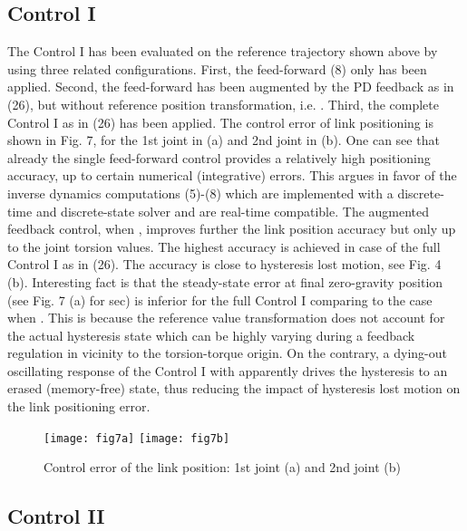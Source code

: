 \documentclass[a4paper, 10pt, conference]{ieeeconf}
\begin{document}
\subsection*{Control I} \label{sec:6:1}


The Control I has been evaluated on the reference trajectory shown
above by using three related configurations. First, the
feed-forward (8) only has been applied. Second, the feed-forward
has been augmented by the PD feedback as in (26), but without
reference position transformation, i.e. .
Third, the complete Control I as in (26) has been applied. The
control error of link positioning is shown in Fig. 7, for the 1st
joint in (a) and 2nd joint in (b). One can see that already the
single feed-forward control provides a relatively high positioning
accuracy, up to certain numerical (integrative) errors. This
argues in favor of the inverse dynamics computations (5)-(8) which
are implemented with a discrete-time and discrete-state solver and
are real-time compatible. The augmented feedback control, when
, improves further the link position accuracy
but only up to the joint torsion values. The highest accuracy is
achieved in case of the full Control I as in (26). The accuracy is
close to hysteresis lost motion, see Fig. 4 (b).
Interesting fact is that the steady-state error at final
zero-gravity position (see Fig. 7 (a) for  sec) is inferior
for the full Control I comparing to the case when . This is because the reference value transformation does
not account for the actual hysteresis state which can be highly
varying during a feedback regulation in vicinity to the
torsion-torque origin. On the contrary, a dying-out oscillating
response of the Control I with  apparently
drives the hysteresis to an erased (memory-free) state, thus
reducing the impact of hysteresis lost motion on the link
positioning error.
\begin{figure}[!h]
\centering
\texttt{[image: fig7a]}
\texttt{[image: fig7b]}
\caption{Control error of the link position: 1st joint (a) and 2nd
joint (b)} \label{fig:control1error}
\end{figure}



\subsection*{Control II} \label{sec:6:2}
\end{document}
